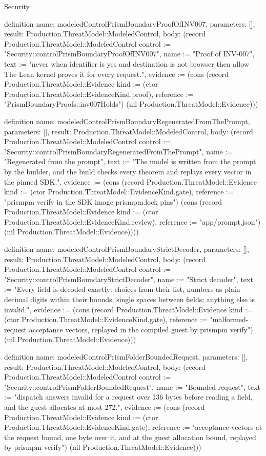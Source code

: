 \begin{lexlean}{Security}
\begin{semanticmodule}
definition{
  name: modeledControlPrismBoundaryProofOfINV007,
  parameters: [],
  result: Production.ThreatModel::ModeledControl,
  body: (record Production.ThreatModel::ModeledControl {control := "Security::controlPrismBoundaryProofOfINV007", name := "Proof of INV-007", text := "never when identifier is yes and destination is not browser then allow The Lean kernel proves it for every request.", evidence := (cons (record Production.ThreatModel::Evidence {kind := (ctor Production.ThreatModel::EvidenceKind.proof), reference := "PrismBoundaryProofs::inv007Holds"}) (nil Production.ThreatModel::Evidence))})
}

definition{
  name: modeledControlPrismBoundaryRegeneratedFromThePrompt,
  parameters: [],
  result: Production.ThreatModel::ModeledControl,
  body: (record Production.ThreatModel::ModeledControl {control := "Security::controlPrismBoundaryRegeneratedFromThePrompt", name := "Regenerated from the prompt", text := "The model is written from the prompt by the builder, and the build checks every theorem and replays every vector in the pinned SDK.", evidence := (cons (record Production.ThreatModel::Evidence {kind := (ctor Production.ThreatModel::EvidenceKind.gate), reference := "prismpm verify in the SDK image prismpm.lock pins"}) (cons (record Production.ThreatModel::Evidence {kind := (ctor Production.ThreatModel::EvidenceKind.review), reference := "app/prompt.json"}) (nil Production.ThreatModel::Evidence)))})
}

definition{
  name: modeledControlPrismBoundaryStrictDecoder,
  parameters: [],
  result: Production.ThreatModel::ModeledControl,
  body: (record Production.ThreatModel::ModeledControl {control := "Security::controlPrismBoundaryStrictDecoder", name := "Strict decoder", text := "Every field is decoded exactly: choices from their list, numbers as plain decimal digits within their bounds, single spaces between fields; anything else is invalid.", evidence := (cons (record Production.ThreatModel::Evidence {kind := (ctor Production.ThreatModel::EvidenceKind.gate), reference := "malformed-request acceptance vectors, replayed in the compiled guest by prismpm verify"}) (nil Production.ThreatModel::Evidence))})
}

definition{
  name: modeledControlPrismFolderBoundedRequest,
  parameters: [],
  result: Production.ThreatModel::ModeledControl,
  body: (record Production.ThreatModel::ModeledControl {control := "Security::controlPrismFolderBoundedRequest", name := "Bounded request", text := "dispatch answers invalid for a request over 136 bytes before reading a field, and the guest allocates at most 272.", evidence := (cons (record Production.ThreatModel::Evidence {kind := (ctor Production.ThreatModel::EvidenceKind.gate), reference := "acceptance vectors at the request bound, one byte over it, and at the guest allocation bound, replayed by prismpm verify"}) (nil Production.ThreatModel::Evidence))})
}


\end{semanticmodule}
\end{lexlean}
